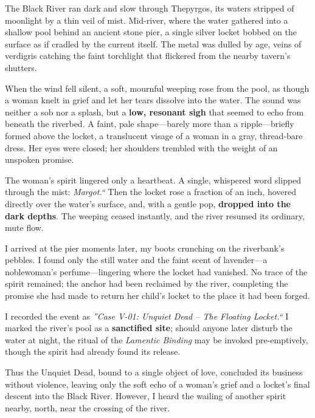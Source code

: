 The Black River ran dark and slow through Thepyrgos, its waters stripped of moonlight by a thin veil of mist. Mid-river, where the water gathered into a shallow pool behind an ancient stone pier, a single silver locket bobbed on the surface as if cradled by the current itself. The metal was dulled by age, veins of verdigris catching the faint torchlight that flickered from the nearby tavern's shutters.

When the wind fell silent, a soft, mournful weeping rose from the pool, as though a woman knelt in grief and let her tears dissolve into the water. The sound was neither a sob nor a splash, but a \textbf{low, resonant sigh} that seemed to echo from beneath the riverbed. A faint, pale shape---barely more than a ripple---briefly formed above the locket, a translucent visage of a woman in a gray, thread-bare dress. Her eyes were closed; her shoulders trembled with the weight of an unspoken promise.

The woman's spirit lingered only a heartbeat. A single, whispered word slipped through the mist: \textit{Margot.``} Then the locket rose a fraction of an inch, hovered directly over the water's surface, and, with a gentle pop, \textbf{dropped into the dark depths}. The weeping ceased instantly, and the river resumed its ordinary, mute flow.

I arrived at the pier moments later, my boots crunching on the riverbank's pebbles. I found only the still water and the faint scent of lavender---a noblewoman's perfume---lingering where the locket had vanished. No trace of the spirit remained; the anchor had been reclaimed by the river, completing the promise she had made to return her child's locket to the place it had been forged.

I recorded the event as \textit{''Case V-01: Unquiet Dead -- The Floating Locket.``} I marked the river's pool as a \textbf{sanctified site}; should anyone later disturb the water at night, the ritual of the \textit{Lamentic Binding} may be invoked pre-emptively, though the spirit had already found its release.

Thus the Unquiet Dead, bound to a single object of love, concluded its business without violence, leaving only the soft echo of a woman's grief and a locket's final descent into the Black River. However, I heard the wailing of another spirit nearby, north, near the crossing of the river.